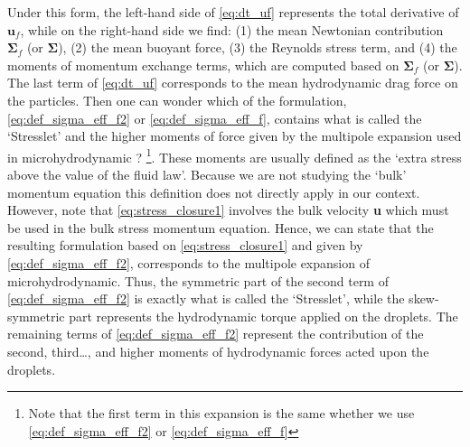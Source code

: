 Under this form, the left-hand side of \ref{eq:dt_uf} represents the total derivative of $\textbf{u}_f$, while on the right-hand side we find: (1) the mean Newtonian contribution $\bm\Sigma_f$ (or $\bm\Sigma$), (2) the mean buoyant force, (3) the Reynolds stress term, and (4) the moments of momentum exchange terms, which are computed based on $\bm\Sigma_f$ (or $\bm\Sigma$). 
The last term of \ref{eq:dt_uf} corresponds to the mean hydrodynamic drag force on the particles.
Then one can wonder which of the formulation, \ref{eq:def_sigma_eff_f2} or \ref{eq:def_sigma_eff_f}, contains what is called the `Stresslet' and the higher moments of force given by the multipole expansion used in microhydrodynamic ? \citep{pozrikidis1992boundary,kim2013microhydrodynamics}\footnote{Note that the first term in this expansion is the same whether we use \ref{eq:def_sigma_eff_f2} or \ref{eq:def_sigma_eff_f}}.   
These moments are usually defined as the `extra stress above the value of the fluid law'\citep{hinch1977averaged}.
Because we are not studying the `bulk' momentum equation this definition does not directly apply in our context. 
However, note that \ref{eq:stress_closure1} involves the bulk velocity \textbf{u} which must be used in the bulk stress momentum equation.
Hence, we can state that the resulting formulation based on \ref{eq:stress_closure1} and given by \ref{eq:def_sigma_eff_f2}, corresponds to the multipole expansion of microhydrodynamic. 
Thus, the symmetric part of the second term of \ref{eq:def_sigma_eff_f2} is exactly what is called the `Stresslet', while the skew-symmetric part represents the hydrodynamic torque applied on the droplets.
The remaining terms of \ref{eq:def_sigma_eff_f2} represent the contribution of the second, third\ldots, and higher moments of hydrodynamic forces acted upon the droplets.  

